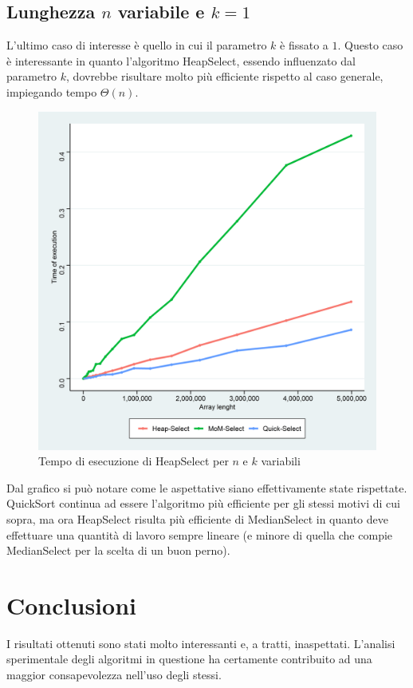 \documentclass{article}
\begin{document}
	\newpage
	
	
	\subsection{Lunghezza $n$ variabile e $k=1$}
	L'ultimo caso di interesse è quello in cui il parametro $k$ è fissato a $1$. Questo caso è interessante in quanto l'algoritmo HeapSelect, essendo influenzato dal parametro $k$, dovrebbe risultare molto più efficiente rispetto al caso generale, impiegando tempo $\Theta\left(n\right)$.
	
	\begin{figure}[h!]
  		\includegraphics[width=\linewidth]{images/Grafico_Con_K1.png}
  		\caption{Tempo di esecuzione di HeapSelect per $n$ e $k$ variabili}
  		\label{fig:graph6}
	\end{figure}
	
	Dal grafico si può notare come le aspettative siano effettivamente state rispettate. QuickSort continua ad essere l'algoritmo più efficiente per gli stessi motivi di cui sopra, ma ora HeapSelect risulta più efficiente di MedianSelect in quanto deve effettuare una quantità di lavoro sempre lineare (e minore di quella che compie MedianSelect per la scelta di un buon perno).
	
	
	\newpage

	\section{Conclusioni}
	I risultati ottenuti sono stati molto interessanti e, a tratti, inaspettati. L'analisi sperimentale degli algoritmi in questione ha certamente contribuito ad una maggior consapevolezza nell'uso degli stessi.
	
\end{document}
